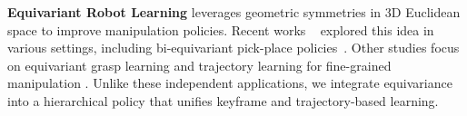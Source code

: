 \textbf{Equivariant Robot Learning} 
leverages geometric symmetries in 3D Euclidean space to improve manipulation policies. 
Recent works ~\cite{iclr22,corl,liu2023continual,kim2023se,kohler2023symmetric,nguyen2023equivariant,nguyen2024symmetry,eisner2024deep,gao2024riemann} explored this idea in various settings, including bi-equivariant pick-place policies~\cite{neural_descriptor,ryu2023diffusion,ryu2023equivariant, pan2023tax,rss22haojie,huang2024fourier, huang2024imagination,huang2024match}. Other studies focus on equivariant grasp learning \cite{rss22xupeng, huang2023edge, huorbitgrasp,lim2024equigraspflow} and trajectory learning for fine-grained manipulation \cite{jia2023seil, wang2024equivariant,yang2024equivact,yang2024equibot}. Unlike these independent applications, we integrate equivariance into a hierarchical policy that unifies keyframe and trajectory-based learning.

